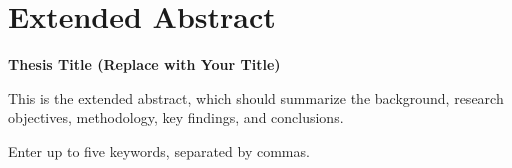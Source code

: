 \chapter*{\centering \Large \textbf{Extended Abstract}}  %

\begin{center}
    {\Large \textbf{Thesis Title (Replace with Your Title)}} %
\end{center}
\vspace{1cm}

\setlength{\parindent}{2em} %
{\normalsize
    This is the extended abstract, which should summarize the background, research objectives, methodology, key findings, and conclusions.
}

\vspace{1cm}

{\normalsize Enter up to five keywords, separated by commas.}

\newpage
